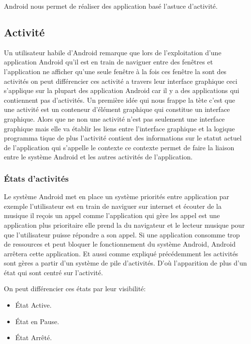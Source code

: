 Android nous permet de réaliser des application basé l'astuce d'activité.

\subsection{Activité}

Un utilisateur habile d'Android remarque que lors de l'exploitation d'une
application Android qu'il est en train de naviguer entre des fenêtres et
l'application ne afficher qu'une seule fenêtre à la fois ces fenêtre la sont
des activités on peut différencier ces activité a travers leur interface
graphique ceci s'applique sur la plupart des application Android car il y a des
applications qui contiennent pas d'activités. Un première idée qui nous frappe
la tète c'est que une activité est un conteneur d'élément graphique qui
constitue un interface graphique. Alors que ne non une activité n'est pas
seulement une interface graphique mais elle va établir les liens entre
l'interface graphique et la logique programma tique de plus l'activité contient
des informations sur le statut actuel de l'application qui s'appelle le
contexte ce contexte permet de faire la liaison entre le système Android et les
autres activités de l'application.

\subsubsection{États d'activités}

Le système Android met en place un système priorités entre application par
exemple l'utilisateur est en train de naviguer sur internet et écouter de la
musique il reçois un appel comme l'application qui gère les appel est une
application plus prioritaire elle prend la du navigateur et le lecteur musique
pour que l'utilisateur puisse répondre a son appel. Si une application consomme
trop de ressources et peut bloquer le fonctionnement du système Android,
Android arrêtera cette application. Et aussi comme expliqué précédemment les
activités sont gères a partir d'un système de pile d'activités. D'où
l'apparition de plus d'un état qui sont centré sur l'activité.

On peut différencier ces états par leur visibilité:

\begin{itemize}
    \item État Active.
    \item État en Pause.
    \item État Arrêté.
\end{itemize}


